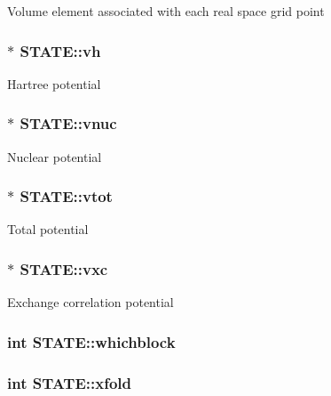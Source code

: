 Volume element associated with each real space grid point \hypertarget{struct_s_t_a_t_e_a60616558e0178cbb95a8db97a5abd95b}{
\subsubsection[{vh}]{$\ast$ S\-T\-A\-T\-E\-::vh}}\label{struct_s_t_a_t_e_a60616558e0178cbb95a8db97a5abd95b}
Hartree potential \hypertarget{struct_s_t_a_t_e_ad81fa098da86bd6516314ca864d8b47d}{
\subsubsection[{vnuc}]{$\ast$ S\-T\-A\-T\-E\-::vnuc}}\label{struct_s_t_a_t_e_ad81fa098da86bd6516314ca864d8b47d}
Nuclear potential \hypertarget{struct_s_t_a_t_e_a3fa6cf25f00320eed1391a2c043d9c3e}{
\subsubsection[{vtot}]{$\ast$ S\-T\-A\-T\-E\-::vtot}}\label{struct_s_t_a_t_e_a3fa6cf25f00320eed1391a2c043d9c3e}
Total potential \hypertarget{struct_s_t_a_t_e_abeecdcf66c17aba722096c62c564b049}{
\subsubsection[{vxc}]{$\ast$ S\-T\-A\-T\-E\-::vxc}}\label{struct_s_t_a_t_e_abeecdcf66c17aba722096c62c564b049}
Exchange correlation potential \hypertarget{struct_s_t_a_t_e_ad25111865f203d3ec06c35c6963bbfd9}{
\subsubsection[{whichblock}]{\setlength{\rightskip}{0pt plus 5cm}int S\-T\-A\-T\-E\-::whichblock}}\label{struct_s_t_a_t_e_ad25111865f203d3ec06c35c6963bbfd9}
\hypertarget{struct_s_t_a_t_e_a5c319fa34878f1a22ff99035837d0a65}{
\subsubsection[{xfold}]{\setlength{\rightskip}{0pt plus 5cm}int S\-T\-A\-T\-E\-::xfold}}\label{struct_s_t_a_t_e_a5c319fa34878f1a22ff99035837d0a65}
